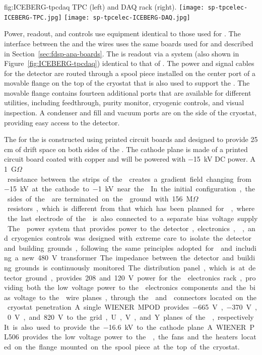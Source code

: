 \begin{dunefigure}
{fig:ICEBERG-tpcdaq}
{ TPC (left) and DAQ rack (right).}
\texttt{[image: sp-tpcelec-ICEBERG-TPC.jpg]}
\texttt{[image: sp-tpcelec-ICEBERG-DAQ.jpg]}
\end{dunefigure}

Power, readout, and controls use equipment identical to those used for . The
interface between the  and the  wires uses the same  boards
used for  and described in Section~\ref{sec:fdsp-apa-boards}. The  is
readout via a  system (also shown in Figure~\ref{fig:ICEBERG-tpcdaq})
identical to that of . The power and signal cables for the detector 
are routed through a spool piece installed on the center port of a movable flange on the 
top of the cryostat that is also used to support the . The movable 
flange contains fourteen additional ports that are available for different utilities, 
including  feedthrough, purity monitor, cryogenic controls, and visual inspection. 
A condenser and  fill and vacuum ports are on the side of the cryostat, 
providing easy access to the detector.

The  for the  is constructed using printed circuit boards and 
designed to provide 25 cm of drift space on both sides of the . The cathode 
plane is made of a printed circuit board coated with copper and will be powered with 
\SI{-15}{kV} DC power. A \SI{1}{G$\Omega$} resistance between the strips of the 
creates a gradient field changing from \SI{-15}{kV} at the cathode to \SI{-1}{kV} near the 
. In the initial configuration, the sides of the  are terminated on the 
ground with \SI{156}{M$\Omega$} resistors, which is different from that which has been
planned for , where the last electrode of the  is also connected to
a separate bias voltage supply. 

The  power system that provides power to the detector, electronics, 
, and cryogenics controls was designed with extreme care to 
isolate the detector and building grounds, following the same principles adopted
for  and including a new \SI{480}{V} transformer. The impedance between the detector
and building grounds is continuously monitored. The distribution panel, which is 
at detector ground, provides 208 and \SI{120}{V} power for the  electronics rack, 
providing both the low voltage power to the  electronics components and the bias 
voltage to the  wire planes, through the  and 
connectors located on the cryostat penetration. A single WIENER MPOD provides 
\SI{-665}{V}, \SI{-370}{V}, \SI{0}{V}, and \SI{820}{V} to the grid, U, V, and 
Y planes of the , respectively. It is also used to provide the 
\SI{-16.6}{kV} to the cathode plane. A WIENER PL506 provides the low voltage
power to the , the fans and the heaters located on the 
flange mounted on the spool piece at the top of the cryostat. 

